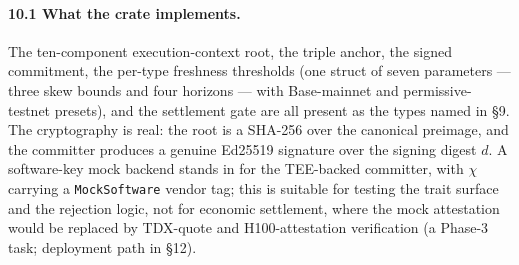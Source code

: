 \documentclass[11pt]{article}
\begin{document}
\paragraph{10.1 What the crate implements.} The ten-component execution-context root, the triple anchor, the signed commitment, the per-type freshness thresholds (one struct of seven parameters --- three skew bounds and four horizons --- with Base-mainnet and permissive-testnet presets), and the settlement gate are all present as the types named in \S9. The cryptography is real: the root is a SHA-256 over the canonical preimage, and the committer produces a genuine Ed25519 signature over the signing digest $d$. A software-key mock backend stands in for the TEE-backed committer, with $\chi$ carrying a \texttt{MockSoftware} vendor tag; this is suitable for testing the trait surface and the rejection logic, not for economic settlement, where the mock attestation would be replaced by TDX-quote and H100-attestation verification (a Phase-3 task; deployment path in \S12).
\end{document}
